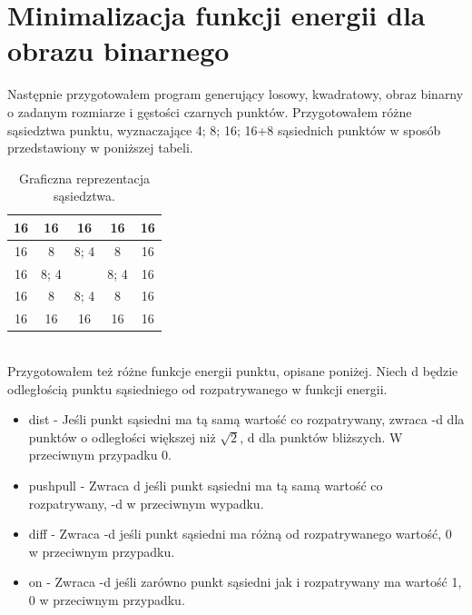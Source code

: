 \documentclass{article}
\begin{document}
    \section{Minimalizacja funkcji energii dla obrazu binarnego}
        Następnie przygotowałem program generujący losowy, kwadratowy, obraz binarny o zadanym rozmiarze i gęstości czarnych punktów.
        Przygotowałem różne sąsiedztwa punktu, wyznaczające 4; 8; 16; 16+8 sąsiednich punktów w sposób przedstawiony w poniższej tabeli. 
        \begin{center}
            \begin{table}[ht]
                \centering
                \begin{tabular}{|c|c|c|c|c|}
                    \hline
                    16 & 16 & 16 & 16 & 16 \\
                    \hline
                    16 & 8 & 8; 4 & 8 & 16\\
                    \hline
                    16 & 8; 4 &  & 8; 4 & 16\\
                    \hline
                    16 & 8 & 8; 4 & 8 & 16\\
                    \hline
                    16 & 16 & 16 & 16 & 16\\
                    \hline 
                \end{tabular}
                \caption{Graficzna reprezentacja sąsiedztwa.}
                \label{tab:my_label}
            \end{table}
        \end{center}\\  
        \FloatBarrier
        Przygotowałem też różne funkcje energii punktu, opisane poniżej.
        Niech d będzie odległością punktu sąsiedniego od rozpatrywanego w funkcji energii. 
        \begin{itemize}
            \item dist - Jeśli punkt sąsiedni ma tą samą wartość co rozpatrywany, zwraca -d dla punktów o odległości większej niż $\sqrt{2}$, d dla punktów bliższych. W przeciwnym przypadku 0.
            \item pushpull - Zwraca d jeśli punkt sąsiedni ma tą samą wartość co rozpatrywany, -d w przeciwnym wypadku. 
            \item diff - Zwraca -d jeśli punkt sąsiedni ma różną od rozpatrywanego wartość, 0 w przeciwnym przypadku. 
            \item on - Zwraca -d jeśli zarówno punkt sąsiedni jak i rozpatrywany ma wartość 1, 0 w przeciwnym przypadku. 
        \end{itemize}
\end{document}
